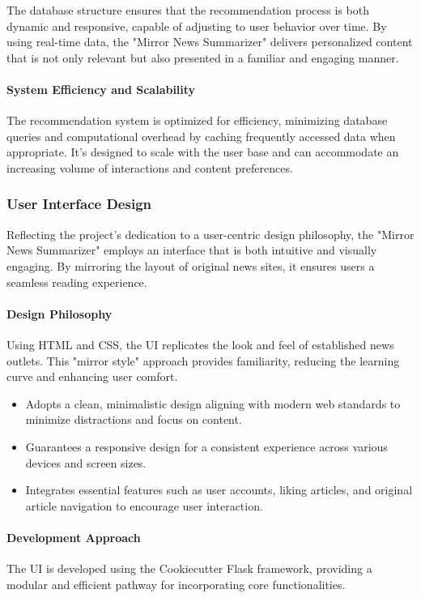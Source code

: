 \documentclass[10pt]{article}
\begin{document}
The database structure ensures that the recommendation process is both dynamic and responsive, capable of adjusting to user behavior over time. By using real-time data, the "Mirror News Summarizer" delivers personalized content that is not only relevant but also presented in a familiar and engaging manner.

\paragraph{System Efficiency and Scalability}
The recommendation system is optimized for efficiency, minimizing database queries and computational overhead by caching frequently accessed data when appropriate. It's designed to scale with the user base and can accommodate an increasing volume of interactions and content preferences.


\subsubsection{User Interface Design}
Reflecting the project's dedication to a user-centric design philosophy, the "Mirror News Summarizer" employs an interface that is both intuitive and visually engaging. By mirroring the layout of original news sites, it ensures users a seamless reading experience.

\paragraph{Design Philosophy}
Using HTML and CSS, the UI replicates the look and feel of established news outlets. This "mirror style" approach provides familiarity, reducing the learning curve and enhancing user comfort.

\begin{itemize}
    \item Adopts a clean, minimalistic design aligning with modern web standards to minimize distractions and focus on content.
    \item Guarantees a responsive design for a consistent experience across various devices and screen sizes.
    \item Integrates essential features such as user accounts, liking articles, and original article navigation to encourage user interaction.
\end{itemize}

\paragraph{Development Approach}
The UI is developed using the Cookiecutter Flask framework, providing a modular and efficient pathway for incorporating core functionalities.
\end{document}
